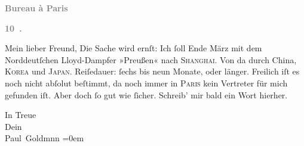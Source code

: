 \pstart
           \begin{otherlanguage}{french}\textcolor{gray}{\textbf{\textbf{Bureau à Paris}}}\end{otherlanguage}\pend
           
\pstart
           \begin{otherlanguage}{french}\textcolor{gray}{\textbf{\textbf{10 .}}}\end{otherlanguage}\pend
           
\pstart\center{}Mein lieber Freund,\pend\vspace{0.5em}
\pstart
           Die Sache wird ernſt: Ich ſoll Ende März mit dem Norddeutſchen Lloyd-Dampfer »Preußen« nach \textsc{Shanghai}. Von da durch China, \textsc{Korea} und \textsc{Japan}. Reiſedauer: ſechs bis neun Monate, oder länger. Freilich iſt es noch nicht
               abſolut beſtimmt, da noch immer in \textsc{Paris} kein Vertreter für mich gefunden iſt. Aber doch ſo gut wie ſicher. Schreib’ mir
               bald ein Wort hierher.\pend
           
\pstart
           In Treue {\\[\baselineskip]}Dein {\\[\baselineskip]}\spacefill\mbox{Paul Goldmnn}\pend
           \leftskip=0em{}\endnumbering{}  
      